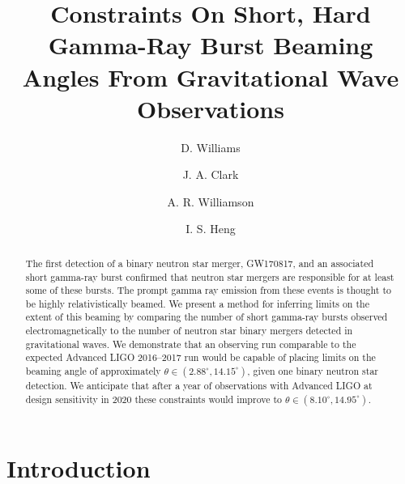 \documentclass[twocolumn]{aastex61}
\begin{document}
\title{Constraints On Short, Hard Gamma-Ray Burst Beaming Angles From
Gravitational Wave Observations}

\author[0000-0003-3772-198X]{D. Williams}
\author[0000-0003-3243-1393]{J. A. Clark}
\author[0000-0002-7627-8688]{A. R. Williamson}
\author[0000-0002-1977-0019]{I. S. Heng}





\begin{abstract}
The first detection of a binary neutron star merger, GW170817, and an associated
short gamma-ray burst confirmed that neutron star mergers are responsible for at
least some of these bursts. The prompt gamma ray emission from these events is
thought to be highly relativistically beamed. We present a method for inferring
limits on the extent of this beaming by comparing the number of short gamma-ray
bursts observed electromagnetically to the number of neutron star binary mergers
detected in gravitational waves.
We demonstrate that an observing run comparable to the expected Advanced LIGO
2016--2017 run would be capable of placing limits on the beaming angle of
approximately $\theta \in (2.88^\circ,14.15^\circ)$, given one binary neutron
star detection.
We anticipate that after a year of observations with Advanced LIGO at design
sensitivity in 2020 these constraints would improve to
$\theta \in (8.10^\circ,14.95^\circ)$. 
\end{abstract}


\section{Introduction}
\end{document}
